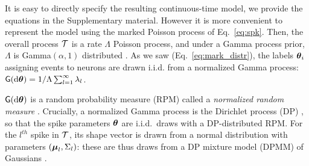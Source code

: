 % 
It is easy to directly specify the resulting continuous-time model, we provide the equations in the Supplementary material. 
However it is more convenient to represent the model using the marked Poisson process of Eq.~\eqref{eq:spk}. %
Then, the overall process $\mathcal{T}$ is a rate $\Lambda$ Poisson process,
and under a Gamma process prior, $\Lambda$ is Gamma$(\alpha,1)$ distributed %
\citep{Ferguson73}.
As we saw (Eq.~\eqref{eq:mark_distr}), the labels $\boldsymbol{\theta}_i$ assigning events to neurons are drawn i.i.d. from a normalized Gamma 
process: %
$ \mathsf{G}(\mathrm{d} \boldsymbol{\theta}) = 1/\Lambda \sum_{l=1}^{\infty} \lambda_l$.

$\mathsf{G}(\mathrm{d} \boldsymbol{\theta})$ is a random probability measure (RPM) called a \emph{normalized random measure} \citep{JamesLP09}. Crucially, a 
normalized Gamma process is the Dirichlet process (DP) \citep{Ferguson73}, so that 
the spike parameters $\boldsymbol{\theta}$ are i.i.d.\ draws with a DP-distributed RPM.
For the $l^{th}$ spike in $\mathcal{T}$, its shape vector is drawn from a normal distribution
with parameters $(\boldsymbol{\mu}_{l}, \Sigma_{l})$: these are thus
draws from a DP mixture model (DPMM) of Gaussians \citep{Lo1984}.

